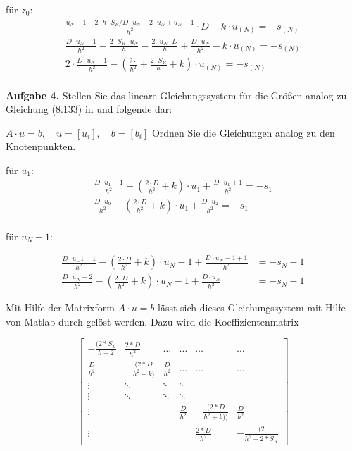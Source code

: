 für $z_0$:
\begin{equation}
	\begin{split}
		\frac{u_N-1-2\cdot h\cdot S_R/D\cdot u_N-2\cdot u_N+u_N-1}{h^2} \cdot D-k\cdot u_(N) = -s_(N)\\
		\frac{D\cdot u_N-1}{h^2}-\frac{2\cdot S_R\cdot u_N}{h}-\frac{2\cdot u_N\cdot D}{h}+\frac{D\cdot u_N}{h^2}-k\cdot u_(N) = -s_(N)\\
		2\cdot \frac{D\cdot u_N-1}{h^2}-(\frac{2\cdot}{h^2} + \frac{2\cdot S_R}{h} + k)\cdot u_(N) = -s_(N)\\
	\end{split}
\end{equation}



\begin{mybox}
	\textbf{Aufgabe 4.} Stellen Sie das lineare Gleichungssystem für die Größen analog zu Gleichung (8.133) in \cite{Atkinson.2004} und folgende dar:
\end{mybox}

$ A\cdot u = b,\quad u = [u_i],\quad b = [b_i]$
Ordnen Sie die Gleichungen analog zu den Knotenpunkten.

für $ u_1$:
\begin{equation}
	\begin{split}
		\frac{D\cdot u_1-1}{h^2}-(\frac{2\cdot D}{h^2} + k)\cdot u_1  + \frac{D\cdot u_1+1}{h^2} = -s_1\\
		\frac{D\cdot u_0}{h^2}-(\frac{2\cdot D}{h^2} + k)\cdot u_1  + \frac{D\cdot u_2}{h^2} = -s_1\\
	\end{split}
\end{equation}


für $ u_N-1$:

\begin{align*}
	\frac{D\cdot u_-1-1}{h^2}-(\frac{2\cdot D}{h^2} + k)\cdot u_N-1  + \frac{D\cdot u_N-1+1}{h^2} &= -s_N-1\\
	\frac{D\cdot u_N-2}{h^2} - (\frac{2\cdot D}{h^2} + k)\cdot u_N-1  + \frac{D\cdot u_N}{h^2} &
	= -s_N-1
\end{align*}

Mit Hilfe der Matrixform $ A\cdot u = b $ lässt sich dieses Gleichungssystem mit Hilfe von Matlab durch  gelöst werden. Dazu wird die Koeffizientenmatrix

\begin{equation}
	\begin{bmatrix}
		-\frac{(2*S_L}{h + 2} & \frac{2*D}{h^2} & \dots &  \dots &  \dots &  \dots \\
		\frac{D}{h^2} & -\frac{(2*D}{h^2 + k)} & \frac{D}{h^2} &  \dots &  \dots &  \dots \\
	\vdots	&  \ddots &  \ddots &  \ddots &  &  \\
	\vdots	& \ddots & \ddots & \ddots &  &  \\
	\vdots	&  &  & \frac{D}{h^2} & -\frac{(2*D}{h^2 + k))} & \frac{D}{h^2} \\
	\vdots	&  &  &  & \frac{2*D}{h^2} & -\frac{(2}{h^2 + 2*S_R} 
	\end{bmatrix}
\end{equation}
 

